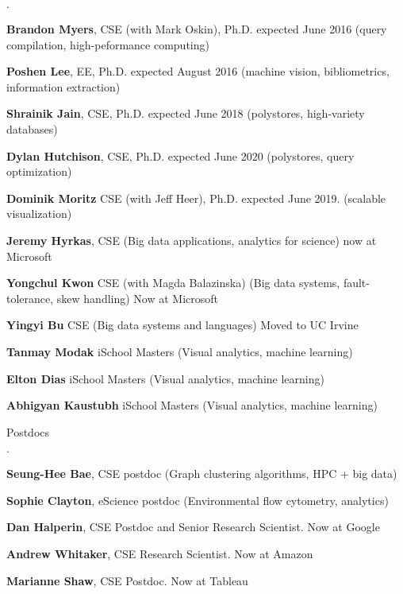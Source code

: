 \documentclass[10pt]{article}
\newenvironment{bulletlist}
   {
      \begin{list}
         {$\cdot$}
         {
            \setlength{\itemsep}{.5ex}
            \setlength{\parsep}{0ex}
            \setlength{\leftmargin}{0.7em}
            \setlength{\parskip}{0ex}
            \setlength{\topsep}{0ex}
         }
   }
   {
      \end{list}
   }
\newcommand{\marginlabel}[1]{
\begin{minipage}[b]{0.8\labelwidth}{\large \textsf{\textbf{#1}}}\end{minipage}}
\newcommand{\entrylabel}[1]{\mbox{\marginlabel{#1}}\hfill}
\newcommand{\MainListlabel}[1]
   {
      \parbox[t]{\labelwidth}{\hspace{.8em}\marginlabel{#1}}
   }
\newenvironment{MainList}[1]
   {
      \renewcommand{\entrylabel}{\MainListlabel}
      \begin{list}{}
      {
         \renewcommand{\makelabel}{\entrylabel}
         \setlength   {\itemindent}{-.65em}
         \setlength   {\labelwidth}{#1}
         \setlength   {\leftmargin}{\labelwidth}
         \setlength   {\itemsep}{3ex}
      }
   }
   {
      \end{list}
   }
\begin{document}
\begin{MainList}{88pt}
\begin{bulletlist}
\item {\bf Brandon Myers}, CSE (with Mark Oskin), Ph.D. expected June 2016 (query compilation, high-peformance computing)
\item {\bf Poshen Lee}, EE, Ph.D. expected August 2016 (machine vision, bibliometrics, information extraction)
\item {\bf Shrainik Jain}, CSE, Ph.D. expected June 2018 (polystores, high-variety databases)
\item {\bf Dylan Hutchison}, CSE, Ph.D. expected June 2020 (polystores, query optimization)
\item {\bf Dominik Moritz} CSE (with Jeff Heer), Ph.D. expected June 2019. (scalable visualization)
\item {\bf Jeremy Hyrkas}, CSE (Big data applications, analytics for science) now at Microsoft
\item {\bf Yongchul Kwon} CSE (with Magda Balazinska) (Big data systems, fault-tolerance, skew handling) Now at Microsoft
\item {\bf Yingyi Bu} CSE (Big data systems and languages) Moved to UC Irvine
\item {\bf Tanmay Modak} iSchool Masters (Visual analytics, machine learning)
\item {\bf Elton Dias} iSchool Masters (Visual analytics, machine learning)
\item {\bf Abhigyan Kaustubh} iSchool Masters (Visual analytics, machine learning)
\end{bulletlist}

\item [Postdocs]

\begin{bulletlist}
\item {\bf Seung-Hee Bae}, CSE postdoc (Graph clustering algorithms, HPC + big data)
\item {\bf Sophie Clayton}, eScience postdoc (Environmental flow cytometry, analytics)
\item {\bf Dan Halperin}, CSE Postdoc and Senior Research Scientist. Now at Google
\item {\bf Andrew Whitaker}, CSE Research Scientist.  Now at Amazon
\item {\bf Marianne Shaw}, CSE Postdoc. Now at Tableau
\end{bulletlist}



\end{MainList}
\end{document}
